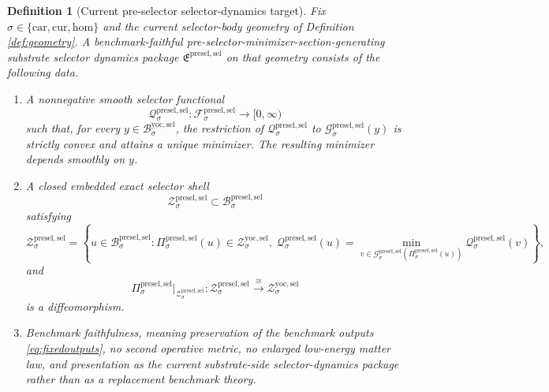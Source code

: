 \documentclass[11pt]{article}
\newcommand{\Car}{\mathrm{car}}
\newcommand{\Cur}{\mathrm{cur}}
\newcommand{\Hom}{\mathrm{hom}}
\newcommand{\YoctoSelectorBody}[1]{\mathcal B_{#1}^{\mathrm{yoc,sel}}}
\newcommand{\YoctoSelectorShell}[1]{\mathcal Z_{#1}^{\mathrm{yoc,sel}}}
\newcommand{\PreSectionSelectorPackage}{\mathfrak E^{\mathrm{presel,sel}}}
\newcommand{\PreSectionSelectorSpace}[1]{\mathcal F_{#1}^{\mathrm{presel,sel}}}
\newcommand{\PreSectionSelectorBody}[1]{\mathcal B_{#1}^{\mathrm{presel,sel}}}
\newcommand{\PreSectionSelectorProj}[1]{\Pi_{#1}^{\mathrm{presel,sel}}}
\newcommand{\PreSectionSelectorFiber}[2]{\mathcal G_{#1}^{\mathrm{presel,sel}}(#2)}
\newcommand{\PreSectionSelectorFunctional}[1]{\mathscr Q_{#1}^{\mathrm{presel,sel}}}
\newcommand{\PreSectionSelectorShell}[1]{\mathcal Z_{#1}^{\mathrm{presel,sel}}}
\newtheorem{definition}{Definition}
\begin{document}
\begin{definition}[Current pre-selector selector-dynamics target]
\label{def:selector}
Fix \(\sigma\in\{\Car,\Cur,\Hom\}\) and the current selector-body geometry of Definition \ref{def:geometry}. A \emph{benchmark-faithful pre-selector-minimizer-section-generating substrate selector dynamics package} \(\PreSectionSelectorPackage\) on that geometry consists of the following data.
\begin{enumerate}
    \item A nonnegative smooth selector functional
    \[
    \PreSectionSelectorFunctional{\sigma}:\PreSectionSelectorSpace{\sigma}\to[0,\infty)
    \]
    such that, for every \(y\in\YoctoSelectorBody{\sigma}\), the restriction of \(\PreSectionSelectorFunctional{\sigma}\) to \(\PreSectionSelectorFiber{\sigma}{y}\) is strictly convex and attains a unique minimizer. The resulting minimizer depends smoothly on \(y\).
    \item A closed embedded exact selector shell
    \[
    \PreSectionSelectorShell{\sigma}\subset\PreSectionSelectorBody{\sigma}
    \]
    satisfying
    \[
    \PreSectionSelectorShell{\sigma}
    =
    \left\{
    u\in\PreSectionSelectorBody{\sigma}:
    \PreSectionSelectorProj{\sigma}(u)\in\YoctoSelectorShell{\sigma},
    \;
    \PreSectionSelectorFunctional{\sigma}(u)
    =
    \min_{v\in\PreSectionSelectorFiber{\sigma}{\PreSectionSelectorProj{\sigma}(u)}}
    \PreSectionSelectorFunctional{\sigma}(v)
    \right\},
    \]
    and
    \[
    \PreSectionSelectorProj{\sigma}\big|_{\PreSectionSelectorShell{\sigma}}
    :
    \PreSectionSelectorShell{\sigma}\xrightarrow{\cong}\YoctoSelectorShell{\sigma}
    \]
    is a diffeomorphism.
    \item Benchmark faithfulness, meaning preservation of the benchmark outputs \eqref{eq:fixedoutputs}, no second operative metric, no enlarged low-energy matter law, and presentation as the current substrate-side selector-dynamics package rather than as a replacement benchmark theory.
\end{enumerate}
\end{definition}
\end{document}
